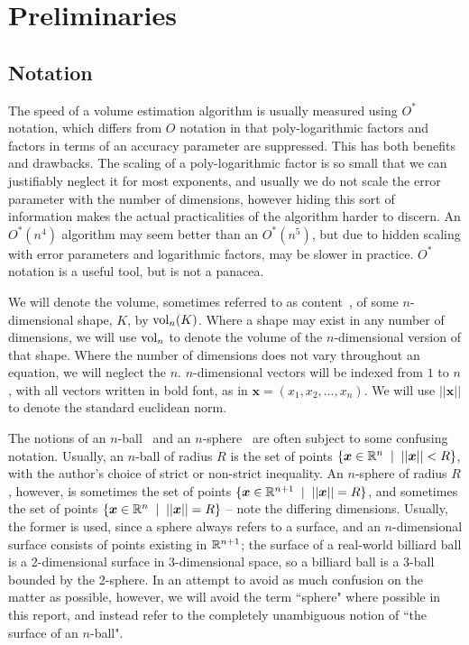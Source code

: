 \section{Preliminaries}
\subsection{Notation}

The speed of a volume estimation algorithm is usually measured using $O^{*}$ notation, which differs from $O$ notation in that poly-logarithmic factors and factors in terms of an accuracy parameter are suppressed. This has both benefits and drawbacks. The scaling of a poly-logarithmic factor is so small that we can justifiably neglect it for most exponents, and usually we do not scale the error parameter with the number of dimensions, however hiding this sort of information makes the actual practicalities of the algorithm harder to discern. An $O^{*}(n^4)$ algorithm may seem better than an $O^{*}(n^5)$, but due to hidden scaling with error parameters and logarithmic factors, may be slower in practice. $O^{*}$ notation is a useful tool, but is not a panacea.

We will denote the volume, sometimes referred to as content~\cite{mathworld_content}, of some $n$-dimensional shape, $K$, by $\mbox{vol}_n(K)$. Where a shape may exist in any number of dimensions, we will use $\mbox{vol}_n$ to denote the volume of the $n$-dimensional version of that shape. Where the number of dimensions does not vary throughout an equation, we will neglect the $n$. $n$-dimensional vectors will be indexed from $1$ to $n$, with all vectors written in bold font, as in ${\bm x} = (x_1, x_2, ..., x_n)$. We will use $||\bm{x}||$ to denote the standard euclidean norm.

The notions of an $n$-ball~\cite{mathworld_ball} and an $n$-sphere~\cite{mathworld_sphere} are often subject to some confusing notation. Usually, an $n$-ball of radius $R$ is the set of points $\{{\bm x} \in \mathbb{R}^n  \;\; | \;\; ||\bm{x}|| < R \}$, with the author's choice of strict or non-strict inequality. An $n$-sphere of radius $R$, however, is sometimes the set of points $\{{\bm x} \in \mathbb{R}^{n+1}  \;\; | \;\; ||\bm{x}|| = R \}$, and sometimes the set of points $\{{\bm x} \in \mathbb{R}^{n}  \;\; | \;\; ||\bm{x}|| = R \}$ -- note the differing dimensions. Usually, the former is used, since a sphere always refers to a surface, and an $n$-dimensional surface consists of points existing in $\mathbb{R}^{n+1}$; the surface of a real-world billiard ball is a 2-dimensional surface in 3-dimensional space, so a billiard ball is a 3-ball bounded by the 2-sphere. In an attempt to avoid as much confusion on the matter as possible, however, we will avoid the term ``sphere" where possible in this report, and instead refer to the completely unambiguous notion of ``the surface of an $n$-ball".

